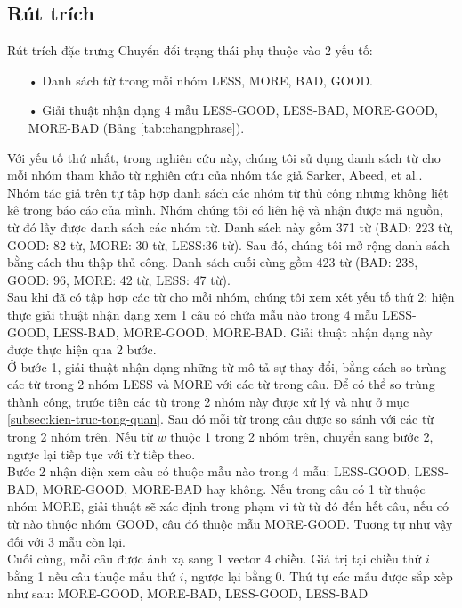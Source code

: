 \subsection*{Rút trích}
Rút trích đặc trưng Chuyển đổi trạng thái phụ thuộc vào 2 yếu tố:
\begin{itemize}
\item[•] Danh sách từ trong mỗi nhóm LESS, MORE, BAD, GOOD.
\item[•] Giải thuật nhận dạng 4 mẫu LESS-GOOD, LESS-BAD, MORE-GOOD, MORE-BAD (Bảng \ref{tab:changphrase}).
\end{itemize}
Với yếu tố thứ nhất, trong nghiên cứu này, chúng tôi sử dụng danh sách từ cho mỗi nhóm tham khảo từ nghiên cứu của nhóm tác giả Sarker, Abeed, et al.\cite{sarker2011outcome}. Nhóm tác giả trên tự tập hợp danh sách các nhóm từ thủ công nhưng không liệt kê trong báo cáo của mình. Nhóm chúng tôi có liên hệ và nhận được mã nguồn, từ đó lấy được danh sách các nhóm từ. Danh sách này gồm 371 từ (BAD: 223 từ, GOOD: 82 từ, MORE: 30 từ, LESS:36 từ). Sau đó, chúng tôi mở rộng danh sách bằng cách thu thập thủ công. Danh sách cuối cùng gồm 423 từ (BAD: 238, GOOD: 96, MORE: 42 từ, LESS: 47 từ).\\

Sau khi đã có tập hợp các từ cho mỗi nhóm, chúng tôi xem xét yếu tố thứ 2: hiện thực giải thuật nhận dạng xem 1 câu có chứa mẫu nào trong 4 mẫu LESS-GOOD, LESS-BAD, MORE-GOOD, MORE-BAD. Giải thuật nhận dạng này được thực hiện qua 2 bước.\\

Ở bước 1, giải thuật nhận dạng những từ mô tả sự thay đổi, bằng cách so trùng các từ trong 2 nhóm LESS và MORE với các từ trong câu. Để có thể so trùng thành công, trước tiên các từ trong 2 nhóm này được xử lý  và  như ở mục \ref{subsec:kien-truc-tong-quan}. Sau đó mỗi từ trong câu được so sánh với các từ trong 2 nhóm trên.  Nếu từ $w$ thuộc 1 trong 2 nhóm trên, chuyển sang bước 2, ngược lại tiếp tục với từ tiếp theo.\\

Bước 2 nhận diện xem câu có thuộc mẫu nào trong 4 mẫu: LESS-GOOD, LESS-BAD, MORE-GOOD, MORE-BAD hay không. Nếu trong câu có 1 từ thuộc nhóm MORE, giải thuật sẽ xác định trong phạm vi từ từ đó đến hết câu, nếu có từ nào thuộc nhóm GOOD, câu đó thuộc mẫu MORE-GOOD. Tương tự như vậy đối với 3 mẫu còn lại.\\

Cuối cùng, mỗi câu được ánh xạ sang 1 vector 4 chiều. Giá trị tại chiều thứ $i$ bằng 1 nếu câu thuộc mẫu thứ $i$, ngược lại bằng 0. Thứ tự các mẫu được sắp xếp như sau: MORE-GOOD, MORE-BAD, LESS-GOOD, LESS-BAD

